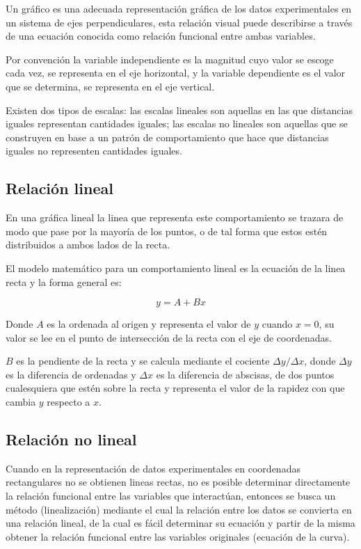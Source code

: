 \documentclass[letter,11pt]{article}
\begin{document}
Un gráfico es una adecuada representación gráfica de los datos experimentales en
un sistema de ejes perpendiculares, esta relación visual puede describirse a
través de una ecuación conocida como relación funcional entre ambas variables.

Por convención la variable independiente es la magnitud cuyo valor se escoge
cada vez, se representa en el eje horizontal, y la variable dependiente es el
valor que se determina, se representa en el eje vertical.

Existen dos tipos de escalas: las escalas lineales son aquellas en las que
distancias iguales representan cantidades iguales; las escalas no lineales son
aquellas que se construyen en base a un patrón de comportamiento que hace que
distancias iguales no representen cantidades iguales.

\subsection{Relación lineal}
En una gráfica lineal la linea que representa este comportamiento se trazara de
modo que pase por la mayoría de los puntos, o de tal forma que estos estén
distribuidos a ambos lados de la recta.

El modelo matemático para un comportamiento lineal es la ecuación de la linea
recta y la forma general es:

\begin{equation}
    y = A + B x
\end{equation}

Donde $A$ es la ordenada al origen y representa el valor de $y$ cuando $x = 0$,
su valor se lee en el punto de intersección de la recta con el eje de
coordenadas.

$B$ es la pendiente de la recta y se calcula mediante el cociente
$\Delta y/\Delta x$, donde $\Delta y$ es la diferencia de ordenadas y $\Delta x$
es la diferencia de abscisas, de dos puntos cualesquiera que estén sobre la recta
y representa el valor de la rapidez con que cambia $y$ respecto a $x$.

\subsection{Relación no lineal}
Cuando en la representación de datos experimentales en coordenadas rectangulares
no se obtienen lineas rectas, no es posible determinar directamente la relación
funcional entre las variables que interactúan, entonces se busca un método
(linealización) mediante el cual la relación entre los datos se convierta en una
relación lineal, de la cual es fácil determinar su ecuación y partir de la misma
obtener la relación funcional entre las variables originales (ecuación de la
curva).
\end{document}
